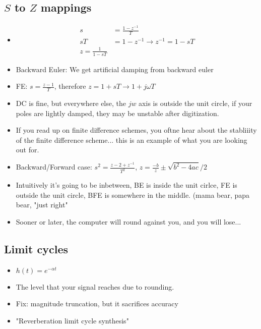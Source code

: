 \subsection*{$S$ to $Z$ mappings}
\begin{itemize}
\item{
\begin{align*}
s &= \frac{1 - z^{-1}}{T}\\
sT &= 1 - z^{-1} \rightarrow z^{-1} = 1 - sT\\
z = \frac{1}{1 - sT}
\end{align*}
}
\item{
Backward Euler: We get artificial damping from backward euler
}
\item{
FE: $s = \frac{z - 1}{T}$, therefore $z = 1 + sT \rightarrow 1 + j\omega T$
} \item{
DC is fine, but everywhere else, the $jw$ axis is outside the unit circle, 
if your poles are lightly damped, they may be unstable after digitization.
}
\item{
If you read up on finite difference schemes, you oftne hear about the stabliiity of the finite
difference scheme... this is an example of what you are looking out for. 
}
\item{
Backward/Forward case: $s^2 = \frac{z - 2 + z^{-1}}{T^2} $,
$z = \frac{-b}{z} \pm \sqrt{b^2 - 4ac} / 2$
}
\item{
Intuitively it's going to be inbetween, BE is inside the unit cirlce, FE is outside the unit circle, 
BFE is somewhere in the middle. (mama bear, papa bear, "just right"
}
\item{
Sooner or later, the computer will round against you, and you will lose...
}
\end{itemize}

\subsection*{Limit cycles}
\begin{itemize}
\item{
$h(t) = e^{-\alpha t}
$
}
\item{
The level that your signal reaches due to rounding.
}
\item{
Fix: magnitude truncation, but it sacrifices accuracy
}
\item{
"Reverberation limit cycle synthesis"
}
\end{itemize}


